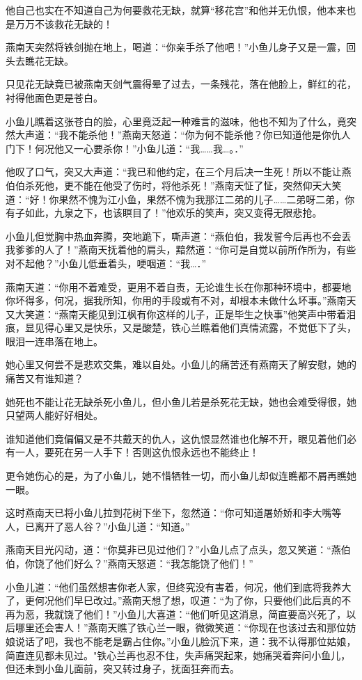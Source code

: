 \documentclass[12pt,oneside]{book}
\begin{document}
他自己也实在不知道自己为何要救花无缺，就算``移花宫''和他并无仇恨，他本来也是万万不该救花无缺的！

燕南天突然将铁剑抛在地上，喝道：``你亲手杀了他吧！''小鱼儿身子又是一震，回头去瞧花无缺。

只见花无缺竟已被燕南天剑气震得晕了过去，一条残花，落在他脸上，鲜红的花，衬得他面色更是苍白。

小鱼儿瞧着这张苍白的脸，心里竟泛起一种难言的滋味，他也不知为了什么，竟突然大声道：``我不能杀他！''燕南天怒道：``你为何不能杀他？你已知道他是你仇人门下！何况他又一心要杀你！''小鱼儿道：``我\ldots\ldots 我\ldots。．''

他叹了口气，突又大声道：``我已和他约定，在三个月后决一生死！所以不能让燕伯伯杀死他，更不能在他受了伤时，将他杀死！''燕南天怔了怔，突然仰天大笑道：``好！你果然不愧为江小鱼，果然不愧为我那江二弟的儿子\ldots\ldots 二弟呀二弟，你有子如此，九泉之下，也该瞑目了！''他欢乐的笑声，突又变得无限悲抢。

小鱼儿但觉胸中热血奔腾，突地跪下，嘶声道：``燕伯伯，我发誓今后再也不会丢我爹爹的人了！''燕南天抚着他的肩头，黯然道：``你可是自觉以前所作所为，有些对不起他？''小鱼儿低垂着头，哽咽道：``我\ldots．''

燕南天道：``你用不着难受，更用不着自责，无论谁生长在你那种环境中，都要地你坏得多，何况，据我所知，你用的手段或有不对，却根本未做什么坏事。''燕南天又大笑道：``燕南天能见到江枫有你这样的儿子，正是毕生之快事''他笑声中带着泪痕，显见得心里又是快乐，又是酸楚，铁心兰瞧着他们真情流露，不觉低下了头，眼泪一连串落在地上。

她心里又何尝不是悲欢交集，难以自处。小鱼儿的痛苦还有燕南天了解安慰，她的痛苦又有谁知道？

她死也不能让花无缺杀死小鱼儿，但小鱼儿若是杀死花无缺，她也会难受得很，她只望两人能好好相处。

谁知道他们竟偏偏又是不共戴天的仇人，这仇恨显然谁也化解不开，眼见着他们必有一人，要死在另一人手下！否则这仇恨永远也不能终止！

更令她伤心的是，为了小鱼儿，她不惜牺牲一切，而小鱼儿却似连瞧都不屑再瞧她一眼。

这时燕南天已将小鱼儿拉到花树下坐下，忽然道：``你可知道屠娇娇和李大嘴等人，已离开了恶人谷？''小鱼儿道：``知道。''

燕南天目光闪动，道：``你莫非已见过他们？''小鱼儿点了点头，忽又笑道：``燕伯伯，你饶了他们好么？''燕南天怒道：``我怎能饶了他们！''

小鱼儿道：``他们虽然想害你老人家，但终究没有害着，何况，他们到底将我养大了，更何况他们早巳改过。''燕南天想了想，叹道：``为了你，只要他们此后真的不再为恶，我就饶了他们！''小鱼儿大喜道：``他们听见这消息，简直要高兴死了，以后哪里还会害人！''燕南天瞧了铁心兰一眼，微微笑道：``你现在也该过去和那位妨娘说话了吧，我也不能老是霸占住你。''小鱼儿脸沉下来，道：我不认得那位姑娘，简直连见都未见过。"铁心兰再也忍不住，失声痛哭起来，她痛哭着奔问小鱼儿，但还未到小鱼儿面前，突又转过身子，抚面狂奔而去。
\end{document}
